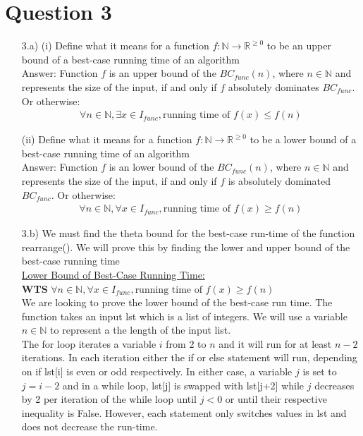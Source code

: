 \documentclass[20pt]{article}
\begin{document}
\section*{Question 3}
\begin{enumerate}
    \item[3.a)] (i) Define what it means for a function $f:\mathbb{N}\rightarrow\mathbb{R}^{\geq 0}$ to be an upper bound of a best-case running time of an algorithm\\
    Answer: Function $f$ is an upper bound of the $BC_{func}(n)$, where $n\in\mathbb{N}$ and represents the size of the input, if and only if $f$ absolutely dominates $BC_{func}$. Or otherwise:
    \begin{align}
        \forall n\in\mathbb{N}, \exists x\in I_{func}, \text{running time of } f(x) \leq f(n)\nonumber
    \end{align}
    
    (ii) Define what it means for a function $f:\mathbb{N}\rightarrow\mathbb{R}^{\geq 0}$ to be a lower bound of a best-case running time of an algorithm\\
    Answer: Function $f$ is an lower bound of the $BC_{func}(n)$, where $n\in\mathbb{N}$ and represents the size of the input, if and only if $f$  is absolutely dominated $BC_{func}$. Or otherwise:
    \begin{align}
        \forall n\in\mathbb{N}, \forall x\in I_{func}, \text{running time of } f(x) \geq f(n)\nonumber
    \end{align}
    
    \item[3.b)] We must find the theta bound for the best-case run-time of the function rearrange(). We will prove this by finding the lower and upper bound of the best-case running time\\
    
    \underline{Lower Bound of Best-Case Running Time:}\\
    \textbf{WTS} $\forall n\in\mathbb{N}, \forall x\in I_{func}, \text{running time of } f(x) \geq f(n)\nonumber$\\
    We are looking to prove the lower bound of the best-case run time. The function takes an input lst which is a list of integers. We will use a variable $n\in\mathbb{N}$ to represent a the length of the input list.\\
    
    The for loop iterates a variable $i$ from $2$ to $n$ and it will run for at least $n-2$ iterations. In each iteration either the if or else statement will run, depending on if lst[i] is even or odd respectively. In either case, a variable $j$ is set to $j = i - 2$ and in a while loop, lst[j] is swapped with lst[j+2] while $j$ decreases by 2 per iteration of the while loop until $j<0$ or until their respective inequality is False. However, each statement only switches values in lst and does not decrease the run-time.\\
    

\end{enumerate}
\end{document}

